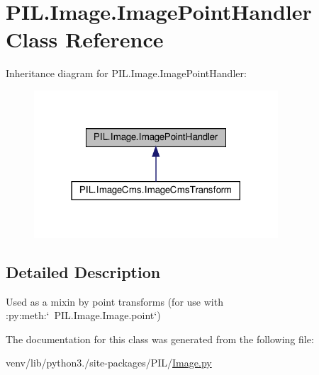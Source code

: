 \hypertarget{classPIL_1_1Image_1_1ImagePointHandler}{}\section{P\+I\+L.\+Image.\+Image\+Point\+Handler Class Reference}
\label{classPIL_1_1Image_1_1ImagePointHandler}


Inheritance diagram for P\+I\+L.\+Image.\+Image\+Point\+Handler\+:
\nopagebreak
\begin{figure}[H]
\begin{center}
\leavevmode
\includegraphics[width=258pt]{classPIL_1_1Image_1_1ImagePointHandler__inherit__graph}
\end{center}
\end{figure}


\subsection{Detailed Description}
\begin{DoxyVerb}Used as a mixin by point transforms
(for use with :py:meth:`~PIL.Image.Image.point`)
\end{DoxyVerb}
 

The documentation for this class was generated from the following file\+:\begin{DoxyCompactItemize}
\item 
venv/lib/python3./site-\/packages/\+P\+I\+L/\hyperlink{Image_8py}{Image.\+py}\end{DoxyCompactItemize}
